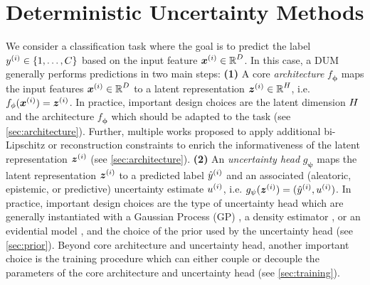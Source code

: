 \section{Deterministic Uncertainty Methods}
\label{sec:dum}

We consider a classification task where the goal is to predict the label $y^{(i)} \in \{ 1, \ldots , C \}$ based on the input feature ${\bm{x}}^{(i)} \in \operatorname{\mathbb{R}}^{D}$. In this case, a DUM generally performs predictions in two main steps: \textbf{(1)} A core \emph{architecture} $f_\mathbf{\phi}$ maps the input features ${\bm{x}}^{(i)} \in \operatorname{\mathbb{R}}^{D}$ to a latent representation ${\bm{z}}^{(i)} \in \operatorname{\mathbb{R}}^{H}$, i.e. $f_\mathbf{\phi}({\bm{x}}^{(i)})={\bm{z}}^{(i)}$. In practice, important design choices are the latent dimension $H$ and the architecture $f_\mathbf{\phi}$ which should be adapted to the task (see \cref{sec:architecture}). Further, multiple works proposed to apply additional bi-Lipschitz or reconstruction constraints to enrich the informativeness of the latent representation ${\bm{z}}^{(i)}$ (see \cref{sec:architecture}). \textbf{(2)} An \emph{uncertainty head} $g_\mathbf{\psi}$ maps the latent representation ${\bm{z}}^{(i)}$ to a predicted label $\hat{y}^{(i)}$ and an associated (aleatoric, epistemic, or predictive) uncertainty estimate $u^{(i)}$, i.e. $g_\mathbf{\psi}({\bm{z}}^{(i)})=(\hat{y}^{(i)}, u^{(i)})$. In practice, important design choices are the type of uncertainty head which are generally instantiated with a Gaussian Process (GP) \citep{liu2020sngp, van2021due, van2020uncertainty, bilos2019uncertainty, charpentier2022rl}, a density estimator \citep{charpentier2020pn, charpentier2022natpn, charpentier2022rl, stadler2021graph, bilos2019uncertainty, mukhoti2021ddu, postels2020mir, winkens2020contrastive, wu2020contrastive}, or an evidential model \citep{charpentier2020pn, charpentier2022natpn, charpentier2022rl, stadler2021graph, bilos2019uncertainty, malinin2018prior}, and the choice of the prior used by the uncertainty head (see \cref{sec:prior}). Beyond core architecture and uncertainty head, another important choice is the training procedure which can either couple or decouple the parameters of the core architecture and uncertainty head (see \cref{sec:training}).

